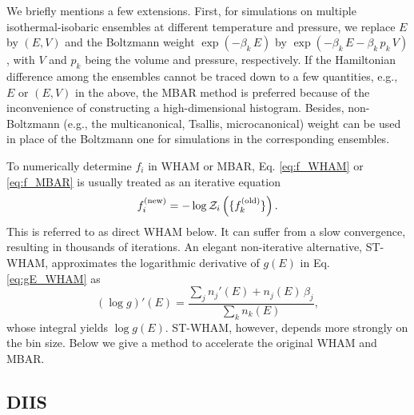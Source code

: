 \documentclass[reprint,superscriptaddress]{revtex4-1}
\begin{document}
We briefly mentions a few extensions.
%
First,
for simulations
on multiple isothermal-isobaric ensembles
at different temperature and pressure,
%
we replace $E$ by $(E, V)$
and the Boltzmann weight
$\exp(-\beta_k \, E)$
by
$\exp(-\beta_k \, E - \beta_k \, p_k \, V)$,
with
$V$ and $p_k$
being the volume and pressure,
respectively.
%
If the Hamiltonian difference among the ensembles
cannot be traced down to a few quantities,
e.g., $E$ or $(E, V)$ in the above,
the MBAR method is preferred\cite{
shirts2008}
because of the inconvenience
of constructing a high-dimensional histogram.
%
Besides,
non-Boltzmann
(e.g., the multicanonical\cite{
mezei1987, *berg1992, *lee1993},
Tsallis\cite{tsallis1988},
microcanonical\cite{
yan2003, *martin-mayor2007, *zhang2013})
weight
can be used in place of the Boltzmann one
for simulations in the corresponding ensembles.
%



To numerically determine $f_i$ in WHAM or MBAR,
Eq. \eqref{eq:f_WHAM} or \eqref{eq:f_MBAR}
is usually treated as an iterative equation
%
\begin{equation*}
f_i^\mathrm{(new)}
=
-\log \mathcal{Z}_i\left(
  \{ f_k^\mathrm{(old)} \}
\right).
\end{equation*}
%
This is referred to as
direct WHAM below.
%
It can suffer from a slow convergence,
resulting in thousands of iterations\cite{
bereau2009, kim2011}.
%
An elegant non-iterative alternative, ST-WHAM,
approximates the logarithmic derivative of $g(E)$
in Eq. \eqref{eq:gE_WHAM} as
%
\begin{equation}
(\log g)'(E)
=
\frac{
  \sum_j n_j'(E) + n_j(E) \, \beta_j
}
{
  \sum_k n_k(E)
},
\label{eq:beta_STWHAM}
\end{equation}
%
whose integral yields $\log g(E)$.
%
ST-WHAM, however,
depends more strongly on the bin size.
%
Below we give a method to accelerate
the original WHAM and MBAR.





\subsection{DIIS}
\end{document}
